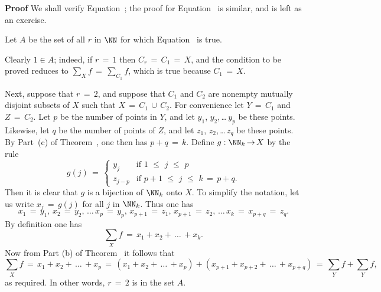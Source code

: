 \V

        {\bf Proof} We shall verify Equation~; the proof for Equation~ is similar, and is left as an exercise.

        Let $A$ be the set of all $r$ in ${\NN}$ for which Equation~ is true.

        Clearly $1{\in}A$; indeed, if $r \,=\, 1$ then $C_{r} \,=\, C_{1} \,=\, X$, and the condition to be proved reduces to
    ${\sum}_{X} f \,=\, {\sum}_{C_{1}} f$, which is true because $C_{1} \,=\, X$.

        Next, suppose that $r \,=\, 2$, and suppose that $C_{1}$ and $C_{2}$ are nonempty mutually disjoint subsets of $X$ such that $X \,=\, C_{1}\,{\cup}\,C_{2}$.
    For convenience let $Y \,=\, C_{1}$ and $Z \,=\, C_{2}$.
    Let $p$ be the number of points in $Y$, and let $y_{1}$, $y_{2}$,\,{\ldots}\,$y_{p}$ be these points.
    Likewise, let $q$ be the number of points of $Z$, and let $z_{1}$, $z_{2}$,\,{\ldots}\,$z_{q}$ be these points.
    By Part~(c) of Theorem~, one then has $p+q \,=\, k$.
    Define $g:{\NN}_{k} \,{\rightarrow}\, X$ by the rule
        \begin{displaymath}
        g(j) \,=\,
        \left\{
        \begin{array}{ll}
        y_{j}    & \mbox{if $1\,\,{\leq}\,\,j\,\,{\leq}\,\,p$} \\
        z_{j-p}  & \mbox{if $p+1\,\,{\leq}\,\,j\,\,{\leq}\,\,k$} \,=\, p+q.
        \end{array}
        \right.
        \end{displaymath}
    Then it is clear that $g$ is a bijection of ${\NN}_{k}$ onto $X$.
    To simplify the notation, let us write $x_{j} \,=\, g(j)$ for all $j$ in ${\NN}_{k}$.
    Thus one has
        \begin{displaymath}
        x_{1} \,=\, y_{1}, \,x_{2} \,=\, y_{2},\,{\ldots}\,x_{p} \,=\, y_{p},\,x_{p+1} \,=\, z_{1},\, x_{p+1} \,=\, z_{2},\,{\ldots}\,x_{k} \,=\, x_{p+q} \,=\, z_{q}.
        \end{displaymath}
    By definition one has
        \begin{displaymath}
        {\sum}_{X} f \,=\, x_{1} + x_{2} + \,{\ldots}\, + x_{k}.
        \end{displaymath}
    Now from Part (b) of Theorem~ it follows that
        \begin{displaymath}
        {\sum}_{X} f \,=\, x_{1} + x_{2} + \,{\ldots}\, + x_{p} \,=\, (x_{1} + x_{2} + \,{\ldots}\, + x_{p}) + (x_{p+1} + x_{p+2} + \,{\ldots}\, + x_{p+q})
     \,=\,
         {\sum}_{Y} f +  {\sum}_{Y} f,
        \end{displaymath}
    as required.  In other words, $r \,=\, 2$ is in the set $A$.

